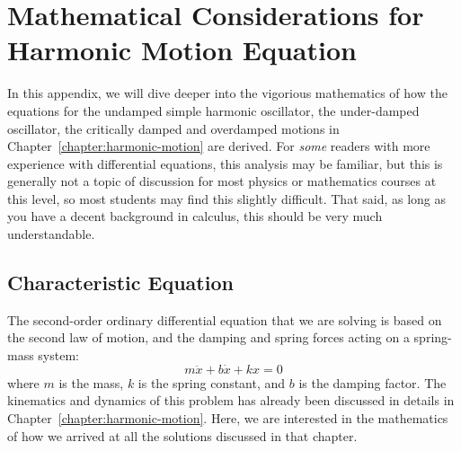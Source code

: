 \chapter{Mathematical Considerations for Harmonic Motion Equation}
\label{appendix:harmonic-motion}

In this appendix, we will dive deeper into the vigorious mathematics of how
the equations for the undamped simple harmonic oscillator, the under-damped
oscillator, the critically damped and overdamped motions in
Chapter~\ref{chapter:harmonic-motion} are derived. For \emph{some}
readers with more experience with differential equations, this analysis may be
familiar, but this is generally not a topic of discussion for most physics or
mathematics courses at this level, so most students may find this slightly
difficult. That said, as long as you have a decent background in calculus,
this should be very much understandable.



\section{Characteristic Equation}

The second-order ordinary differential equation that we are solving is based on
the second law of motion, and the damping and spring forces acting on a
spring-mass system:
\begin{equation}
  m\ddot x+b\dot x+kx=0
  \label{eq:general-ode}
\end{equation}
where $m$ is the mass, $k$ is the spring constant, and $b$ is the damping
factor. The kinematics and dynamics of this problem has already been discussed
in details in Chapter~\ref{chapter:harmonic-motion}. Here, we are interested in
the mathematics of how we arrived at all the solutions discussed in that
chapter.

